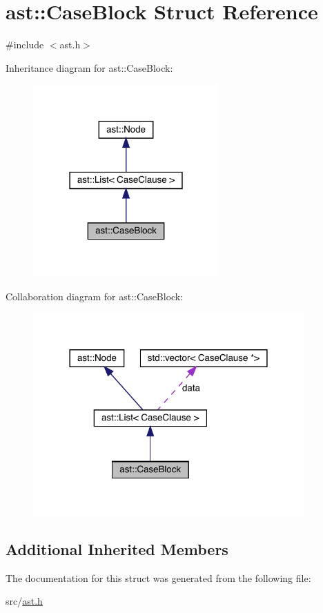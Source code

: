 \hypertarget{structast_1_1_case_block}{}\section{ast\+:\+:Case\+Block Struct Reference}
\label{structast_1_1_case_block}


{\ttfamily \#include $<$ast.\+h$>$}



Inheritance diagram for ast\+:\+:Case\+Block\+:
\nopagebreak
\begin{figure}[H]
\begin{center}
\leavevmode
\includegraphics[width=202pt]{structast_1_1_case_block__inherit__graph}
\end{center}
\end{figure}


Collaboration diagram for ast\+:\+:Case\+Block\+:
\nopagebreak
\begin{figure}[H]
\begin{center}
\leavevmode
\includegraphics[width=294pt]{structast_1_1_case_block__coll__graph}
\end{center}
\end{figure}
\subsection*{Additional Inherited Members}


The documentation for this struct was generated from the following file\+:\begin{DoxyCompactItemize}
\item 
src/\hyperlink{ast_8h}{ast.\+h}\end{DoxyCompactItemize}
